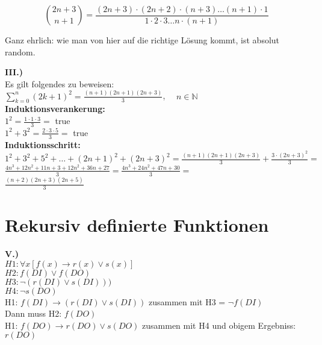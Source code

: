 \documentclass[12pt]{scrartcl}
\begin{document}
\[\binom{2n+3}{n+1} = \frac{(2n+3) \cdot (2n+2) \cdot (n+3) \dots (n+1) \cdot 1}{1 \cdot 2 \cdot 3 \dots n \cdot (n+1)}\]

Ganz ehrlich: wie man von hier auf die richtige Lösung kommt, ist absolut random.

\newpage
\textbf{III.)}\\

Es gilt folgendes zu beweisen:\\

$\displaystyle{\sum_{k=0}^{n} (2k+1)^2 = \frac{(n+1)(2n+1)(2n+3)}{3}}$, $\quad n \in \mathbb{N}$\\

\textbf{Induktionsverankerung:}\\

$\displaystyle{1^2 = \frac{1 \cdot 1 \cdot 3}{3}} = $ true\\

$\displaystyle{1^2 + 3^2 = \frac{2 \cdot 3 \cdot 5}{3}} = $ true\\


\textbf{Induktionsschritt:}\\

$\displaystyle{1^2 + 3^2 + 5^2 + \dots + (2n + 1)^2 + (2n + 3)^2 = \frac{(n+1)(2n+1)(2n+3)}{3} + \frac{3 \cdot (2n + 3)^2}{3}} = $\\

$\displaystyle{\frac{4n^3 + 12n^2 + 11n + 3 + 12n^2 + 36n + 27}{3} = \frac{4n^3 + 24n^2 + 47n + 30}{3}} = $\\

$\displaystyle{\frac{(n+2)(2n+3)(2n+5)}{3}}$



\newpage
\section{Rekursiv definierte Funktionen}
\textbf{V.)}\\

$H1: \forall x [f(x) \rightarrow r(x) \lor s(x)]$\\
$H2: f(DI) \lor f(DO)$\\
$H3: \lnot (r(DI) \lor s(DI)))$\\
$H4: \lnot s(DO)$\\

H1: $f(DI) \rightarrow (r(DI) \lor s(DI))$ zusammen mit H3 = $\lnot f(DI)$\\
Dann muss H2: $f(DO)$\\

H1: $f(DO) \rightarrow r(DO) \lor s(DO)$ zusammen mit H4 und obigem Ergebniss: $r(DO)$\\
\end{document}
